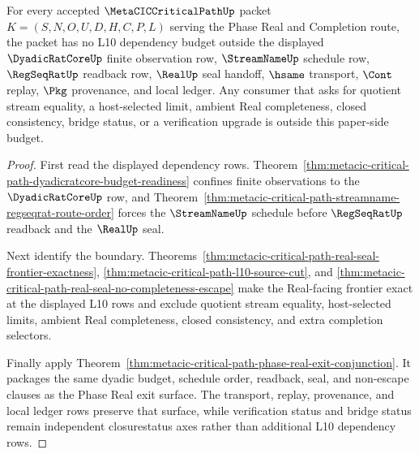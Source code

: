 \begin{theorem}
\label{thm:metacic-critical-path-phase-real-budget-exhaustion}
For every accepted $\MetaCICCriticalPathUp$ packet $K=(S,N,O,U,D,H,C,P,L)$ serving the Phase Real and Completion route, the packet has no L10 dependency budget outside the displayed $\DyadicRatCoreUp$ finite observation row, $\StreamNameUp$ schedule row, $\RegSeqRatUp$ readback row, $\RealUp$ seal handoff, $\hsame$ transport, $\Cont$ replay, $\Pkg$ provenance, and local ledger. Any consumer that asks for quotient stream equality, a host-selected limit, ambient Real completeness, closed consistency, bridge status, or a verification upgrade is outside this paper-side budget.
\end{theorem}
\begin{proof}
First read the displayed dependency rows. Theorem~\ref{thm:metacic-critical-path-dyadicratcore-budget-readiness} confines finite observations to the $\DyadicRatCoreUp$ row, and Theorem~\ref{thm:metacic-critical-path-streamname-regseqrat-route-order} forces the $\StreamNameUp$ schedule before $\RegSeqRatUp$ readback and the $\RealUp$ seal.

Next identify the boundary. Theorems~\ref{thm:metacic-critical-path-real-seal-frontier-exactness}, \ref{thm:metacic-critical-path-l10-source-cut}, and \ref{thm:metacic-critical-path-real-seal-no-completeness-escape} make the Real-facing frontier exact at the displayed L10 rows and exclude quotient stream equality, host-selected limits, ambient Real completeness, closed consistency, and extra completion selectors.

Finally apply Theorem~\ref{thm:metacic-critical-path-phase-real-exit-conjunction}. It packages the same dyadic budget, schedule order, readback, seal, and non-escape clauses as the Phase Real exit surface. The transport, replay, provenance, and local ledger rows preserve that surface, while verification status and bridge status remain independent closurestatus axes rather than additional L10 dependency rows.
\end{proof}

